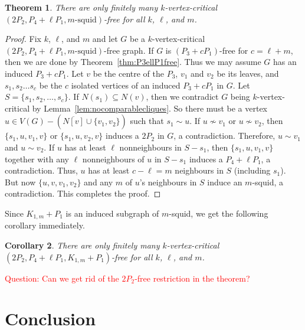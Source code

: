 \documentclass[11pt]{article}
\newtheorem{theorem}{Theorem}[section]
\newtheorem{corollary}[theorem]{Corollary}
\theoremstyle{definition}
\newcommand{\noneighbs}{\overline{N[v]}}
\begin{document}
\begin{theorem}
There are only finitely many $k$-vertex-critical $(2P_2,P_4+\ell P_1,m\text{-squid})$-free for all $k$, $\ell$, and $m$.
\end{theorem}
\begin{proof}
Fix $k$, $\ell$, and $m$ and let $G$ be a $k$-vertex-critical $(2P_2,P_4+\ell P_1,m\text{-squid})$-free graph. If $G$ is $(P_3+c P_1)$-free for $c= \ell+m$, then we are done by Theorem~\ref{thm:P3ellP1free}. Thus we may assume $G$ has an induced $P_3+c P_1$. Let $v$ be the centre of the $P_3$, $v_1$ and $v_2$ be its leaves, and $s_1,s_2\ldots s_c$ be the $c$ isolated vertices of an induced $P_3+c P_1$ in $G$. Let $S=\{s_1,s_2,\dots,s_c\}$. If $N(s_1)\subseteq N(v)$, then we contradict $G$ being $k$-vertex-critical by Lemma~\ref{lem:nocomparablecliques}. So there must be a vertex $u\in V(G)-(\noneighbs\cup \{v_1,v_2\})$ such that $s_1\sim u$. If $u\nsim v_1$ or $u\nsim v_2$, then $\{s_1,u,v_1,v\}$ or $\{s_1,u,v_2,v\}$ induces a $2P_2$ in $G$, a contradiction. Therefore, $u\sim v_1$ and $u\sim v_2$. If $u$ has at least $\ell$ nonneighbours in $S-s_1$, then $\{s_1,u,v_1,v\}$ together with any $\ell$ nonneighbours of $u$ in  $S-s_1$ induces a $P_4+\ell P_1$, a contradiction. Thus, $u$ has at least $c-\ell=m$ neighbours in $S$ (including $s_1$). But now $\{u,v,v_1,v_2\}$ and any $m$ of $u$'s neighbours in $S$ induce an $m$-squid, a contradiction. This completes the proof.
\end{proof}

Since $K_{1,m}+P_1$ is an induced subgraph of $m$-squid, we get the following corollary immediately.

\begin{corollary}
There are only finitely many $k$-vertex-critical $(2P_2,P_4+\ell P_1,K_{1,m}+P_1)$-free for all $k$, $\ell$, and $m$.
\end{corollary}


\textcolor{red}{Question: Can we get rid of the $2P_2$-free restriction in the theorem?}

\section{Conclusion}
\end{document}
